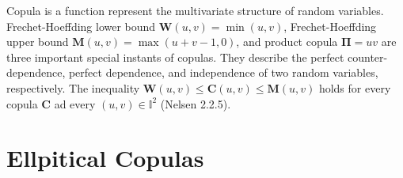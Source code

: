 \documentclass[square]{article} %
\begin{document}
    Copula is a function represent the multivariate structure of random variables.
    Frechet-Hoeffding lower bound $\bm{W}(u,v) = \min(u,v)$, Frechet-Hoeffding upper bound $\bm{M}(u,v) = \max(u+v-1,0)$,
    and product copula $\bm{\Pi}=uv$ are three important special instants of copulas.
    They describe the perfect counter-dependence, perfect dependence, and independence of two random variables, respectively.
    The inequality $\bm{W}(u,v) \leq \bm{C}(u,v) \leq \bm{M}(u,v)$ holds for every copula $\bm{C}$ ad every $(u,v) \in \mathbb{I}^2$ (Nelsen 2.2.5).

    \section{Ellpitical Copulas}\label{sec:ellpitical-copulas}
%
%
%
%
\end{document}
